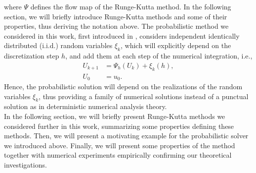where $\Psi$ defines the flow map of the Runge-Kutta method. In the following section, we will briefly introduce Runge-Kutta methods and some of their properties, thus deriving the notation above. The probabilistic method we considered in this work, first introduced in \cite{CGS16}, considers independent identically distributed (i.i.d.) random variables $\xi_k$, which will explicitly depend on the discretization step $h$, and add them at each step of the numerical integration, i.e., 
\begin{equation}\label{eq:probMethod}
\begin{aligned}
	U_{k+1} &= \Psi_h(U_k) + \xi_k(h), \\
	U_0 &= u_0.
\end{aligned}
\end{equation}
Hence, the probabilistic solution will depend on the realizations of the random variables $\xi_k$, thus providing a family of numerical solutions instead of a punctual solution as in deterministic numerical analysis theory. \\
In the following section, we will briefly present Runge-Kutta methods we considered further in this work, summarizing some properties defining these methods. Then, we will present a motivating example for the probabilistic solver we introduced above. Finally, we will present some properties of the method together with numerical experiments empirically confirming our theoretical investigations. 




